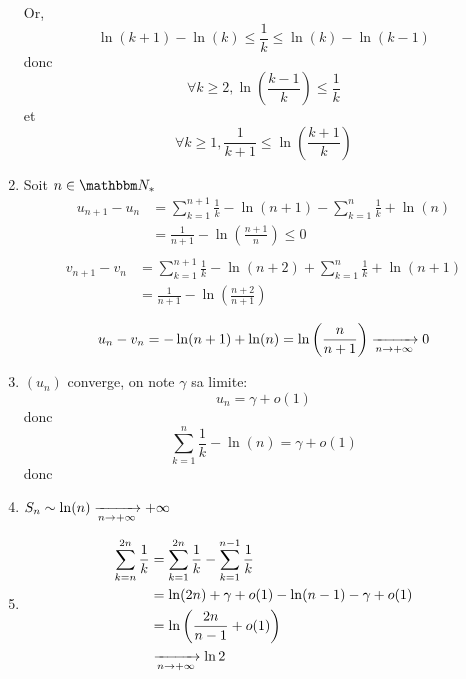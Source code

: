 \begin{enumerate}
		Or, \[
			\ln(k+1) - \ln(k) \le \frac{1}{k} \le \ln(k) - \ln(k-1)
		\] donc \[
			\forall k \ge  2,
			\ln\left( \frac{k-1}{k} \right) \le \frac{1}{k}
		\] et  \[
			\forall k \ge 1, \frac{1}{k+1}\le \ln\left( \frac{k+1}{k} \right)
		\]
	\item Soit $n \in \N_*$ \\
		\begin{align*}
			u_{n+1} - u_n &= \sum_{k=1}^{n+1} \frac{1}{k} - \ln(n+1) - \sum_{k=1}^{n}\frac{1}{k} + \ln(n)\\
			&= \frac{1}{n+1} - \ln\left( \frac{n+1}{n} \right) \le 0\\
		\end{align*}
		\begin{align*}
			v_{n+1} - v_n &= \sum_{k=1}^{n+1}\frac{1}{k}- \ln(n+2) + \sum_{k=1}^n \frac{1}{k} + \ln(n+1)\\
			&= \frac{1}{n+1} - \ln\left( \frac{n+2}{n+1} \right)  \\
		\end{align*}
		\[
			u_n - v_n = -\ln(n+1) +\ln(n) = \ln\left( \frac{n}{n+1} \right) \xrightarrow[n\to +\infty]{} 0
		\] 
	\item $(u_n)$ converge, on note $\gamma$ sa limite: \[
			u_n = \gamma + o(1)
		\] 
		donc \[
			\sum_{k=1}^n \frac{1}{k} - \ln(n) = \gamma + o(1)
		\] donc
		\begin{center}
		\end{center}
	\item $S_n \sim \ln(n) \xrightarrow[n \to +\infty]{} +\infty$
	\item
		\begin{align*}
			\sum_{k=n}^{2n}\frac{1}{k} &= \sum_{k=1}^{2n}\frac{1}{k} - \sum_{k=1}^{n-1} \frac{1}{k} \\
			&= \ln(2n) + \gamma + o(1) - \ln(n-1) - \gamma + o(1)\\
			&= \ln\left( \frac{2n}{n-1}+o(1) \right) \\
			&\xrightarrow[n \to +\infty]{} \ln 2
		\end{align*}
\end{enumerate}
